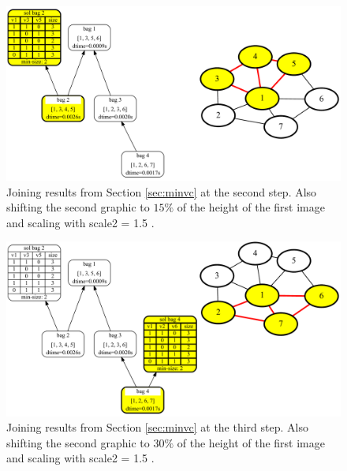 \documentclass[a4paper, 12pt, bibliography=totoc]{scrartcl}
\begin{document}
\begin{figure}[H]
	\centering
	\includegraphics[width=0.9\linewidth,height=0.9\textheight,keepaspectratio]{images/SVGJOIN/default_06sc15_rise2.pdf}
	\caption[Comprehensive example joining results together step 2/5]{Joining results from Section \ref{sec:minvc} at the second step. Also shifting the second graphic to $15\%$ of the height of the first image and scaling with scale2 = 1.5 .}
	\label{fig:joinscaledrise2}
\end{figure}
\begin{figure}[H]
	\centering
	\includegraphics[width=0.9\linewidth,height=0.9\textheight,keepaspectratio]{images/SVGJOIN/default_06sc15_rise3.pdf}
	\caption[Comprehensive example joining results together step 3/5]{Joining results from Section \ref{sec:minvc} at the third step. Also shifting the second graphic to $30\%$ of the height of the first image and scaling with scale2 = 1.5 .}
	\label{fig:joinscaledrise3}
\end{figure}
\end{document}
